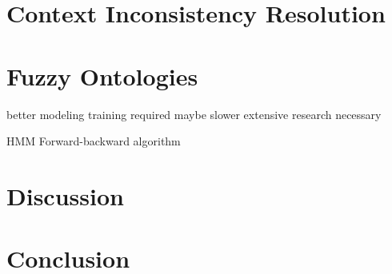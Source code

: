 \documentclass[journal]{vgtc}                %
\begin{document}
\section{Context Inconsistency Resolution}

\section{Fuzzy Ontologies}

better modeling
training required
maybe slower
extensive research necessary

HMM
Forward-backward algorithm

\section{Discussion}

\section{Conclusion}




\end{document}
